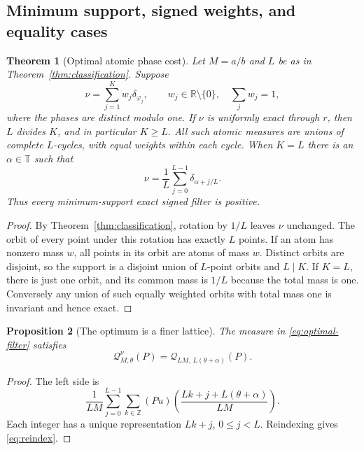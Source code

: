 \documentclass[11pt,a4paper]{article}
\numberwithin{equation}{section}
\newtheorem{theorem}{Theorem}[section]
\newtheorem{proposition}[theorem]{Proposition}
\theoremstyle{definition}
\theoremstyle{remark}
\newcommand{\R}{\mathbb R}\newcommand{\Z}{\mathbb Z}\newcommand{\N}{\mathbb N}
\newcommand{\T}{\mathbb T}\newcommand{\C}{\mathbb C}
\newcommand{\Q}{\mathcal Q}\newcommand{\Def}{\mathcal D}
\begin{document}
\subsection{Minimum support, signed weights, and equality cases}

\begin{theorem}[Optimal atomic phase cost]
\label{thm:atomic}
Let $M=a/b$ and $L$ be as in Theorem~\ref{thm:classification}. Suppose
\begin{equation}
 \nu=\sum_{j=1}^K w_j\delta_{\varphi_j},\qquad
 w_j\in\R\setminus\{0\},\quad \sum_jw_j=1,
 \label{eq:atomic}
\end{equation}
where the phases are distinct modulo one. If $\nu$ is uniformly exact
through $r$, then $L$ divides $K$, and in particular $K\ge L$.
All such atomic measures are unions of complete $L$-cycles, with equal
weights within each cycle. When $K=L$ there is an $\alpha\in\T$ such that
\begin{equation}
 \nu=\frac1L\sum_{j=0}^{L-1}\delta_{\alpha+j/L}.
 \label{eq:optimal-filter}
\end{equation}
Thus every minimum-support exact signed filter is positive.
\end{theorem}
\begin{proof}
By Theorem~\ref{thm:classification}, rotation by $1/L$ leaves $\nu$
unchanged. The orbit of every point under this rotation has exactly
$L$ points. If an atom has nonzero mass $w$, all points in its orbit
are atoms of mass $w$. Distinct orbits are disjoint, so the support is
a disjoint union of $L$-point orbits and $L\mid K$.
If $K=L$, there is just one orbit, and its common mass is $1/L$
because the total mass is one. Conversely any union of such equally
weighted orbits with total mass one is invariant and hence exact.
\end{proof}

\begin{proposition}[The optimum is a finer lattice]
\label{prop:reindex}
The measure in \eqref{eq:optimal-filter} satisfies
\begin{equation}
 \Q^\nu_{M,\theta}(P)=\Q_{LM,\,L(\theta+\alpha)}(P).
 \label{eq:reindex}
\end{equation}
\end{proposition}
\begin{proof}
The left side is
\[
 \frac1{LM}\sum_{j=0}^{L-1}\sum_{k\in\Z}
 (Pu)\!\left(\frac{Lk+j+L(\theta+\alpha)}{LM}\right).
\]
Each integer has a unique representation $Lk+j$, $0\le j<L$.
Reindexing gives \eqref{eq:reindex}.
\end{proof}
\end{document}
